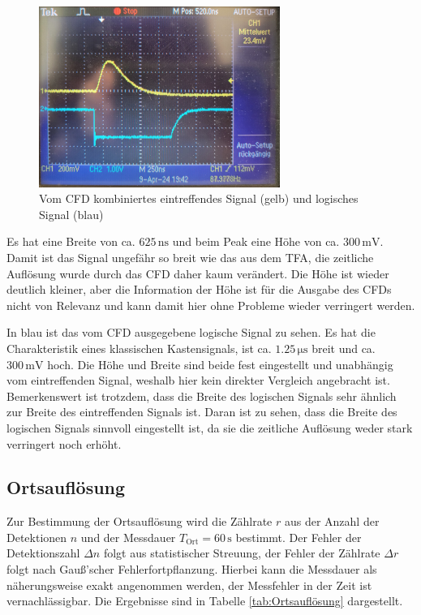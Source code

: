 \documentclass[12pt,a4paper]{scrartcl}
\numberwithin{equation}{section} %
\begin{document}
\begin{figure}[h]
	\centering
	\includegraphics[width=0.7\textwidth]{../media/B3.4/Signal_CFD.jpg}
	\caption{Vom CFD kombiniertes eintreffendes Signal (gelb) und logisches Signal (blau)}
	\label{fig:signal_cfd}
\end{figure}

Es hat eine Breite von ca. $625 \mathrm{\, ns}$ und beim Peak eine Höhe von ca. $300 \mathrm{\, mV}$. Damit ist das Signal ungefähr so breit wie das aus dem TFA, die zeitliche Auflösung wurde durch das CFD  daher kaum verändert. Die Höhe ist wieder deutlich kleiner, aber die Information der Höhe ist für die Ausgabe des CFDs nicht von Relevanz und kann damit hier ohne Probleme wieder verringert werden.

In blau ist das vom CFD ausgegebene logische Signal zu sehen. Es hat die Charakteristik eines klassischen Kastensignals, ist ca. $1.25 \mathrm{\, \mu s}$ breit und ca. $300 \mathrm{\, mV}$ hoch. Die Höhe und Breite sind beide fest eingestellt und unabhängig vom eintreffenden Signal, weshalb hier kein direkter Vergleich angebracht ist. Bemerkenswert ist trotzdem, dass die Breite des logischen Signals sehr ähnlich zur Breite des eintreffenden Signals ist. Daran ist zu sehen, dass die Breite des logischen Signals sinnvoll eingestellt ist, da sie die zeitliche Auflösung weder stark verringert noch erhöht.

\hypertarget{auswertung-ortsaufluxf6sung}{\subsection{Ortsauflösung}\label{auswertung-ortsaufluxf6sung}}
Zur Bestimmung der Ortsauflösung wird die Zählrate $r$ aus der Anzahl der Detektionen $n$ und der Messdauer $T_\mathrm{Ort}=60\,\mathrm{s}$ bestimmt. Der Fehler der Detektionszahl $\Delta n$ folgt aus statistischer Streuung, der Fehler der Zählrate $\Delta r$ folgt nach Gauß'scher Fehlerfortpflanzung. Hierbei kann die Messdauer als näherungsweise exakt angenommen werden, der Messfehler in der Zeit ist vernachlässigbar. Die Ergebnisse sind in Tabelle \ref{tab:Ortsauflösung} dargestellt.
\end{document}
